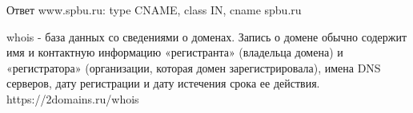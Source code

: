 \documentclass[a4paper,11pt]{article}
\begin{document}
\begin{center}
\label{fig:image}
\end{center}
Ответ www.spbu.ru: type CNAME, class IN, cname spbu.ru

whois - база данных со сведениями о доменах. Запись о домене обычно содержит имя и контактную информацию «регистранта» (владельца домена) и «регистратора» (организации, которая домен зарегистрировала), имена DNS серверов, дату регистрации и дату истечения срока ее действия. \\

https://2domains.ru/whois
\begin{center}
\label{fig:image}
\end{center}
\end{document}
